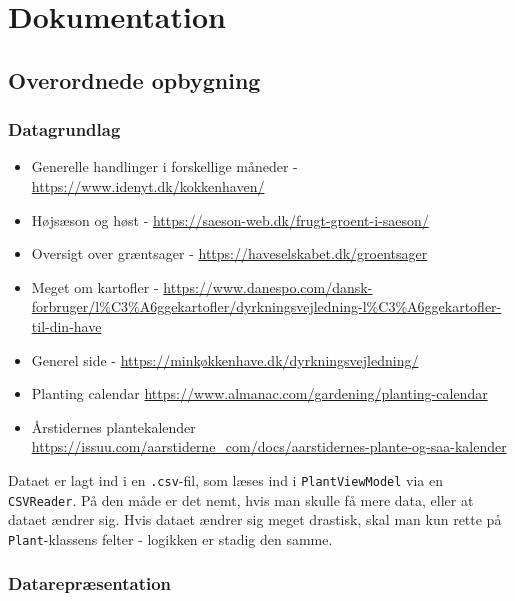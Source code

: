 \newpage
\section{Dokumentation}

\subsection{Overordnede opbygning}

\subsubsection{Datagrundlag}
\begin{itemize}
    \item Generelle handlinger i forskellige måneder - \hyperlink{https://www.idenyt.dk/kokkenhaven/}{https://www.idenyt.dk/kokkenhaven/}
    \item Højsæson og høst - \hyperlink{https://saeson-web.dk/frugt-groent-i-saeson/}{https://saeson-web.dk/frugt-groent-i-saeson/}
    \item Oversigt over græntsager - \hyperlink{https://haveselskabet.dk/groentsager}{https://haveselskabet.dk/groentsager}
    \item Meget om kartofler - \hyperlink{https://www.danespo.com/dansk-forbruger/l\%C3\%A6ggekartofler/dyrkningsvejledning-l\%C3\%A6ggekartofler-til-din-have}{https://www.danespo.com/dansk-forbruger/l\%C3\%A6ggekartofler/dyrkningsvejledning-l\%C3\%A6ggekartofler-til-din-have}
    \item Generel side - \hyperlink{https://minkøkkenhave.dk/dyrkningsvejledning/}{https://minkøkkenhave.dk/dyrkningsvejledning/}
    \item Planting calendar \hyperlink{https://www.almanac.com/gardening/planting-calendar}{https://www.almanac.com/gardening/planting-calendar}
    \item Årstidernes plantekalender \hyperlink{https://issuu.com/aarstiderne\_com/docs/aarstidernes-plante-og-saa-kalender}{https://issuu.com/aarstiderne\_com/docs/aarstidernes-plante-og-saa-kalender}
\end{itemize}

Dataet er lagt ind i en \texttt{.csv}-fil, som læses ind i \texttt{PlantViewModel} via en \texttt{CSVReader}. På den måde er det nemt, hvis man skulle få mere data, eller at dataet ændrer sig. Hvis dataet ændrer sig meget drastisk, skal man kun rette på \texttt{Plant}-klassens felter - logikken er stadig den samme.

\subsubsection{Datarepræsentation}

